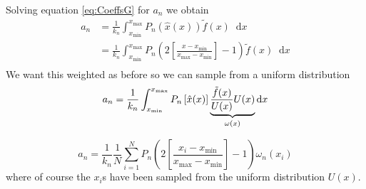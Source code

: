 \documentclass[12pt]{article}
\newcommand{\xmax}{x_{\max}}
\newcommand{\xmin}{x_{\min}}
\newcommand{\xg}{2\left[ \frac{x-\xmin}{\xmax - \xmin} \right] - 1}
\newcommand{\dd}{\mathop{}\!\mathrm{d}}
\begin{document}
Solving equation \eqref{eq:CoeffsG} for $a_n$ we obtain
\begin{equation}
    \begin{split}
        a_n &= \frac{1}{k_n}\int_{\xmin}^{\xmax}P_n(\hat{x}(x))\tilde{f}(x) \dd x \\
         &= \frac{1}{k_n}\int_{\xmin}^{\xmax}P_n\!\left( \xg \right)\tilde{f}(x) \dd x \\
    \end{split}
\end{equation}
We want this weighted as before so we can sample from a uniform distribution
\begin{equation}
    a_n = \frac{1}{k_n} \int_{\xmin}^{\xmax} P_n\left[ \hat{x}(x) \right] \underbrace{\frac{\tilde{f}(x)}{U(x)} U(x)}_{\omega(x)} \dd x \\
\end{equation}

\begin{equation}
    a_n = \frac{1}{k_n}\frac{1}{N}\sum_{i=1}^{N}P_n\!\left( 2\left[\frac{x_i-\xmin}{\xmax-\xmin}\right]-1 \right)\omega_n\!\left(x_i\right)
\end{equation}
where of course the $x_i$s have been sampled from the uniform distribution $U(x)$.
\end{document}
